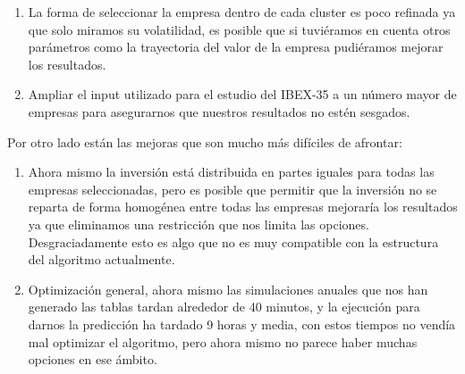 \documentclass[12pt,a4paper]{article}
\begin{document}
	
	\begin{enumerate}
			\item La forma de seleccionar la empresa dentro de cada cluster es poco refinada ya que solo miramos su volatilidad, es posible que si tuviéramos en cuenta otros parámetros como la trayectoria del valor de la empresa pudiéramos mejorar los resultados.
			\item Ampliar el input utilizado para el estudio del IBEX-35 a un número mayor de empresas para asegurarnos que nuestros resultados no estén sesgados.
	\end{enumerate}	
	Por otro lado están las mejoras que son mucho más difíciles de afrontar:\\
	\begin{enumerate}
			\item Ahora mismo la inversión está distribuida en partes iguales para todas las empresas seleccionadas, pero es posible que permitir que la inversión no se reparta de forma homogénea entre todas las empresas mejoraría los resultados ya que eliminamos una restricción que nos limita las opciones. Desgraciadamente esto es algo que no es muy compatible con la estructura del algoritmo actualmente.
			\item Optimización general, ahora mismo las simulaciones anuales que nos han generado las tablas tardan alrededor de 40 minutos, y la ejecución para darnos la predicción ha tardado 9 horas y media, con estos tiempos no vendía mal optimizar el algoritmo, pero ahora mismo no parece haber muchas opciones en ese ámbito.
	\end{enumerate}	
\pagebreak
\end{document}
